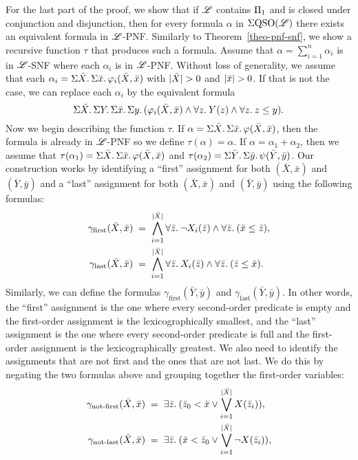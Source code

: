 For the last part of the proof, we show that if $\mathscr{L}$ contains $\Pi_{1}$ and is closed under conjunction and disjunction, then for every formula $\alpha$ in $\Sigma{\rm QSO}(\mathscr{L})$ there exists an equivalent formula in $\mathscr{L}$-PNF. 
Similarly to Theorem~\ref{theo-pnf-snf}, we show a recursive function $\tau$ that produces such a formula. 
Assume that $\alpha = \sum_{i = 1}^n \alpha_i$ is in $\mathscr{L}$-SNF where each $\alpha_i$ is in $\mathscr{L}$-PNF. 
Without loss of generality, we assume that each $\alpha_i = \Sigma{\bar{X}}.\,\Sigma{\bar{x}}.\,\varphi_i(\bar{X},\bar{x})$ with $\vert \bar{X} \vert > 0$ and $\vert \bar{x} \vert > 0$. 
If that is not the case, we can replace each $\alpha_i$ by the equivalent formula
$$
\Sigma{\bar{X}}.\, \Sigma{Y}.\,\Sigma{\bar{x}}.\,\Sigma{y}.\,(\varphi_i(\bar{X},\bar{x})\wedge \forall{z}.\: Y(z) \wedge \forall{z}.\: z \leq y).
$$
Now we begin describing the function $\tau$. 
If $\alpha = \Sigma{\bar{X}}.\,\Sigma{\bar{x}}.\,\varphi(\bar{X},\bar{x})$, then the formula is already in $\mathscr{L}$-PNF so we define $\tau(\alpha) = \alpha$. 
If $\alpha = \alpha_1 + \alpha_2$, then we assume that $\tau(\alpha_1) = \Sigma{\bar{X}}.\,\Sigma{\bar{x}}.\,\varphi(\bar{X},\bar{x})$ and $\tau(\alpha_2) = \Sigma{\bar{Y}}.\,\Sigma{\bar{y}}.\,\psi(\bar{Y},\bar{y})$. 
Our construction works by identifying a ``first'' assignment for both $(\bar{X},\bar{x})$ and $(\bar{Y},\bar{y})$ and a ``last'' assignment for both $(\bar{X},\bar{x})$ and $(\bar{Y},\bar{y})$ using the following formulas:
\begin{align*}
\gamma_{\text{first}}(\bar{X},\bar{x}) & \; = \;  \bigwedge_{i = 1}^{\vert \bar{X} \vert} \forall{\bar{z}}.\:\neg X_i(\bar{z}) \wedge \forall{\bar{z}}.\:(\bar{x}\leq\bar{z}), \\
\gamma_{\text{last}}(\bar{X},\bar{x}) & \; = \;  \bigwedge_{i = 1}^{\vert \bar{X} \vert} \forall{\bar{z}}.\: X_i(\bar{z}) \wedge \forall{\bar{z}}.\:(\bar{z}\leq\bar{x}).
\end{align*}
Similarly, we can define the formulas $\gamma_{\text{first}}(\bar{Y},\bar{y})$ and $\gamma_{\text{last}}(\bar{Y},\bar{y})$.
In other words, the ``first'' assignment is the one where every second-order predicate is empty and the first-order assignment is the lexicographically smallest, and the ``last'' assignment is the one where every second-order predicate is full and the first-order assignment is the lexicographically greatest. 
We also need to identify the assignments that are not first and the ones that are not last. 
We do this by negating the two formulas above and grouping together the first-order variables:
\begin{align*}
\gamma_{\text{not-first}}(\bar{X},\bar{x}) & \; = \; \exists{\bar{z}}.\:(\bar{z}_0 < \bar{x} \vee \bigvee_{i = 1}^{\vert \bar{X} \vert}X(\bar{z}_i)), \\
\gamma_{\text{not-last}}(\bar{X},\bar{x}) & \; = \; \exists{\bar{z}}.\:(\bar{x} < \bar{z}_0 \vee \bigvee_{i = 1}^{\vert \bar{X} \vert}\neg X(\bar{z}_i)),
\end{align*}
